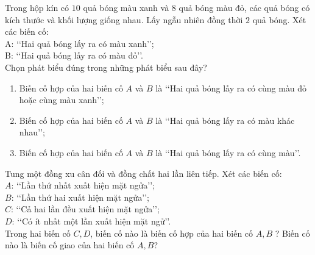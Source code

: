 \begin{bt}%
	Trong hộp kín có $10$ quả bóng màu xanh và $8$ quả bóng màu đỏ, các quả bóng có kích thước và khối lượng giống nhau. Lấy ngẫu nhiên đồng thời $2$ quả bóng. Xét các biến cố:\\
	A: \lq\lq Hai quả bóng lấy ra có màu xanh\rq\rq;\\
	B: \lq\lq Hai quả bóng lấy ra có màu đỏ\rq\rq.\\
	Chọn phát biểu đúng trong những phát biểu sau đây?
	\begin{enumerate}
		\item Biến cố hợp của hai biến cố $A$ và $B$ là \lq\lq Hai quả bóng lấy ra có cùng màu đỏ hoặc cùng màu xanh\rq\rq;
		\item Biến cố hợp của hai biến cố $A$ và $B$ là \lq\lq Hai quả bóng lấy ra có màu khác nhau\rq\rq;
		\item Biến cố hợp của hai biến cố $A$ và $B$ là \lq\lq Hai quả bóng lấy ra có cùng màu\rq\rq.
	\end{enumerate}
\end{bt}

\begin{bt}%
	Tung một đồng xu cân đối và đồng chất hai lần liên tiếp. Xét các biến cố:\\
	$A$: \lq\lq Lần thứ nhất xuất hiện mặt ngửa\rq\rq;\\
	$B$: \lq\lq Lần thứ hai xuất hiện mặt ngửa\rq\rq;\\
	$C$: \lq\lq Cả hai lần đều xuất hiện mặt ngửa\rq\rq;\\
	$D$: \lq\lq Có ít nhất một lần xuất hiện mặt ngử\rq\rq.\\
	Trong hai biến cố $C, D$, biến cố nào là biến cố hợp của hai biến cố $A, B$ ? Biến cố nào là biến cố giao của hai biến cố $A, B$?
\end{bt}

